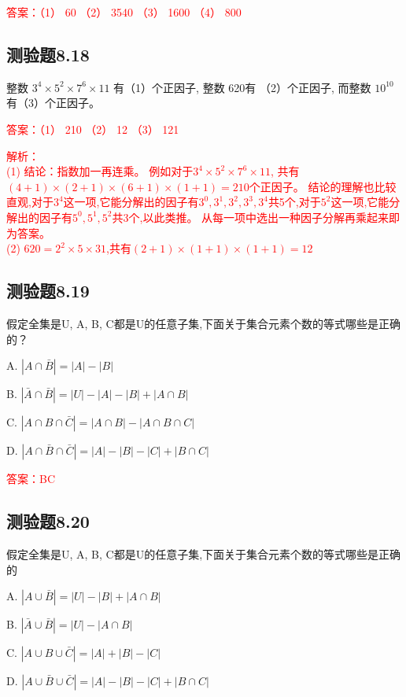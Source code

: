 \documentclass[UTF8, heading=true]{ctexart}
\begin{document}
\textcolor{red}{答案：（1） 60 （2） 3540 （3） 1600 （4） 800}

\subsection{测验题8.18}

整数 $3^4 \times 5^2 \times 7^6 \times 11$ 有（1）个正因子, 整数 620有 （2）个正因子,
而整数 $10^{10}$ 有（3）个正因子。

\textcolor{red}{答案：（1） 210 （2） 12 （3） 121}

\textcolor{red}{解析：\\ \indent(1) 结论：指数加一再连乘。 例如对于$3^4 \times 5^2 \times 7^6 \times 11$,
共有$(4+1) \times (2+1) \times (6+1) \times (1+1)=210$个正因子。
结论的理解也比较直观,对于$3^4$这一项,它能分解出的因子有$3^0,3^1,3^2,3^3,3^4$共5个,对于$5^2$这一项,它能分解出的因子有$5^0,5^1,5^2$共3个,以此类推。
从每一项中选出一种因子分解再乘起来即为答案。\\ \indent(2) $620=2^2 \times 5 \times 31$,共有$(2+1) \times (1+1) \times (1+1)=12$}


\subsection{测验题8.19}

假定全集是U, A, B, C都是U的任意子集,下面关于集合元素个数的等式哪些是正确的？

A. $|A \cap \bar{B}|=|A|-|B|$

B. $|\bar{A} \cap \bar{B}|=|U|-|A|-|B|+|A \cap B|$

C. $|A \cap B \cap \bar{C}|=|A \cap B|-|A \cap B \cap C|$

D. $|A \cap \bar{B} \cap \bar{C}|=|A|-|B|-|C|+|B \cap C|$

\textcolor{red}{答案：BC}

\subsection{测验题8.20}

假定全集是U, A, B, C都是U的任意子集,下面关于集合元素个数的等式哪些是正确的

A. $|A \cup \bar{B}|=|U|-|B|+|A \cap B|$

B. $|\bar{A} \cup \bar{B}|=|U|-|A \cap B|$

C. $|A \cup B \cup \bar{C}|=|A|+|B|-|C|$

D. $|A \cup \bar{B} \cup \bar{C}|=|A|-|B|-|C|+|B \cap C|$
\end{document}
